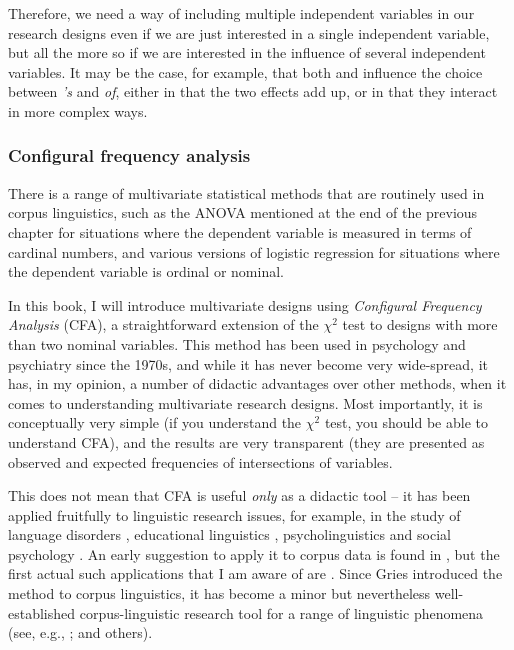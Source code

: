 Therefore, we need a way of including multiple independent variables in our research designs  even if we are just interested in a single independent variable, but all the more so if we are interested in the influence of several independent variables. It may be the case, for example, that both  and  influence the choice between \textit{'s} and \textit{of}, either in that the two effects add up, or in that they interact in more complex ways.

\subsubsection{Configural frequency analysis}\largerpage

There is a range of multivariate  statistical methods that are routinely used in corpus linguistics, such as the ANOVA mentioned at the end of the previous chapter for situations where the dependent variable is measured  in terms of cardinal  numbers, and various versions of logistic regression for situations where the dependent variable is ordinal  or  nominal.

In this book, I will introduce multivariate  designs  using \textit{Configural Frequency Analysis} (CFA),  a straightforward extension of the $\chi^2$  test to designs with more than two nominal  variables. This method has been used in psychology  and psychiatry since the 1970s, and while it has never become very wide\hyp{}spread, it has, in my opinion, a number of didactic advantages over other methods, when it comes to understanding multivariate  research designs.  Most importantly, it is conceptually very simple (if you understand the $\chi^2$  test, you should be able to understand CFA), and the results are very transparent (they are presented as observed and expected  frequencies of intersections of variables.

This does not mean that CFA  is useful \textit{only} as a didactic tool -- it has been applied fruitfully to linguistic research issues, for example, in the study of language disorders \citep{lautsch_strategische_1988}, educational linguistics \citep{fujioka_views_1997}, psycholinguistics  \citep{hsu_infant_2000} and social psychology  \citep{christmann_components_2000}. An early suggestion to apply it to corpus data is found in \citet{schmilz_zahlen_1983}, but the first actual such applications that I am aware of are \citet{gries_evidence_2002, gries_characteristics_2004}. Since Gries introduced the method to corpus linguistics, it has become a minor but nevertheless well\hyp{}established corpus\hyp{}linguistic research tool for a range of linguistic phenomena (see, e.g., \citealt{stefanowitsch_covarying_2005,kristiansen_channel_2008,liu_is_2010,goschler_beyond_2013,buschfeld_cognitive_2014,hilpert_constructional_2015}; and others).


